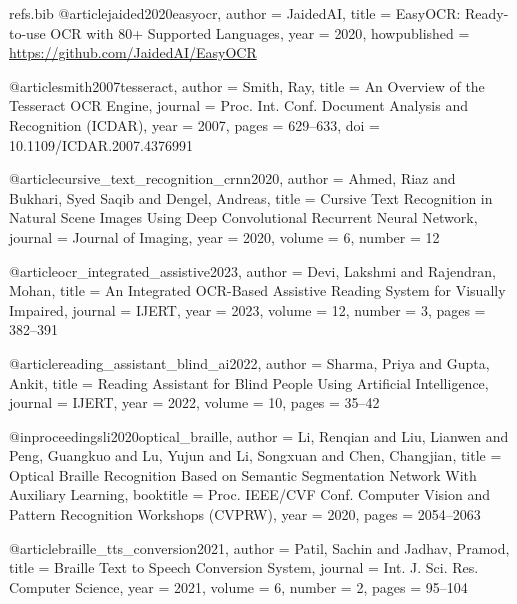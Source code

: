 \begin{filecontents*}{refs.bib}
@article{jaided2020easyocr,
  author    = {{JaidedAI}},
  title     = {{EasyOCR}: Ready-to-use {OCR} with 80+ Supported Languages},
  year      = {2020},
  howpublished = {\url{https://github.com/JaidedAI/EasyOCR}}
}

@article{smith2007tesseract,
  author    = {Smith, Ray},
  title     = {An Overview of the {Tesseract} {OCR} Engine},
  journal   = {Proc. Int. Conf. Document Analysis and Recognition (ICDAR)},
  year      = {2007},
  pages     = {629--633},
  doi       = {10.1109/ICDAR.2007.4376991}
}

@article{cursive_text_recognition_crnn2020,
  author    = {Ahmed, Riaz and Bukhari, Syed Saqib and Dengel, Andreas},
  title     = {Cursive Text Recognition in Natural Scene Images Using Deep Convolutional Recurrent Neural Network},
  journal   = {Journal of Imaging},
  year      = {2020},
  volume    = {6},
  number    = {12}
}

@article{ocr_integrated_assistive2023,
  author    = {Devi, Lakshmi and Rajendran, Mohan},
  title     = {An Integrated {OCR}-Based Assistive Reading System for Visually Impaired},
  journal   = {IJERT},
  year      = {2023},
  volume    = {12},
  number    = {3},
  pages     = {382--391}
}

@article{reading_assistant_blind_ai2022,
  author    = {Sharma, Priya and Gupta, Ankit},
  title     = {Reading Assistant for Blind People Using Artificial Intelligence},
  journal   = {IJERT},
  year      = {2022},
  volume    = {10},
  pages     = {35--42}
}


@inproceedings{li2020optical_braille,
  author    = {Li, Renqian and Liu, Lianwen and Peng, Guangkuo and Lu, Yujun and Li, Songxuan and Chen, Changjian},
  title     = {Optical Braille Recognition Based on Semantic Segmentation Network With Auxiliary Learning},
  booktitle = {Proc. IEEE/CVF Conf. Computer Vision and Pattern Recognition Workshops (CVPRW)},
  year      = {2020},
  pages     = {2054--2063}
}

@article{braille_tts_conversion2021,
  author    = {Patil, Sachin and Jadhav, Pramod},
  title     = {Braille Text to Speech Conversion System},
  journal   = {Int. J. Sci. Res. Computer Science},
  year      = {2021},
  volume    = {6},
  number    = {2},
  pages     = {95--104}
}



\end{filecontents*}
